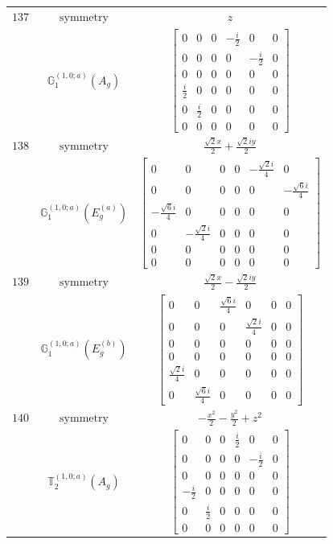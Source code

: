 \documentclass[fleqn,8pt,landscape]{jsarticle}
\begin{document}
\begin{longtable}{ccc}
$ 137 $ & $ \text{symmetry} $ & $ z $ \\
$  $ & $ \mathbb{G}_{1}^{(1,0;a)}(A_{g}) $ & $ \begin{bmatrix} 0 & 0 & 0 & - \frac{i}{2} & 0 & 0 \\ 0 & 0 & 0 & 0 & - \frac{i}{2} & 0 \\ 0 & 0 & 0 & 0 & 0 & 0 \\ \frac{i}{2} & 0 & 0 & 0 & 0 & 0 \\ 0 & \frac{i}{2} & 0 & 0 & 0 & 0 \\ 0 & 0 & 0 & 0 & 0 & 0 \end{bmatrix} $ \\ \hline
$ 138 $ & $ \text{symmetry} $ & $ \frac{\sqrt{2} x}{2} + \frac{\sqrt{2} i y}{2} $ \\
$  $ & $ \mathbb{G}_{1}^{(1,0;a)}(E_{g}^{(a)}) $ & $ \begin{bmatrix} 0 & 0 & 0 & 0 & - \frac{\sqrt{2} i}{4} & 0 \\ 0 & 0 & 0 & 0 & 0 & - \frac{\sqrt{6} i}{4} \\ - \frac{\sqrt{6} i}{4} & 0 & 0 & 0 & 0 & 0 \\ 0 & - \frac{\sqrt{2} i}{4} & 0 & 0 & 0 & 0 \\ 0 & 0 & 0 & 0 & 0 & 0 \\ 0 & 0 & 0 & 0 & 0 & 0 \end{bmatrix} $ \\ \hline
$ 139 $ & $ \text{symmetry} $ & $ \frac{\sqrt{2} x}{2} - \frac{\sqrt{2} i y}{2} $ \\
$  $ & $ \mathbb{G}_{1}^{(1,0;a)}(E_{g}^{(b)}) $ & $ \begin{bmatrix} 0 & 0 & \frac{\sqrt{6} i}{4} & 0 & 0 & 0 \\ 0 & 0 & 0 & \frac{\sqrt{2} i}{4} & 0 & 0 \\ 0 & 0 & 0 & 0 & 0 & 0 \\ 0 & 0 & 0 & 0 & 0 & 0 \\ \frac{\sqrt{2} i}{4} & 0 & 0 & 0 & 0 & 0 \\ 0 & \frac{\sqrt{6} i}{4} & 0 & 0 & 0 & 0 \end{bmatrix} $ \\ \hline
$ 140 $ & $ \text{symmetry} $ & $ - \frac{x^{2}}{2} - \frac{y^{2}}{2} + z^{2} $ \\
$  $ & $ \mathbb{T}_{2}^{(1,0;a)}(A_{g}) $ & $ \begin{bmatrix} 0 & 0 & 0 & \frac{i}{2} & 0 & 0 \\ 0 & 0 & 0 & 0 & - \frac{i}{2} & 0 \\ 0 & 0 & 0 & 0 & 0 & 0 \\ - \frac{i}{2} & 0 & 0 & 0 & 0 & 0 \\ 0 & \frac{i}{2} & 0 & 0 & 0 & 0 \\ 0 & 0 & 0 & 0 & 0 & 0 \end{bmatrix} $ \\ \hline

\end{longtable}
\end{document}
